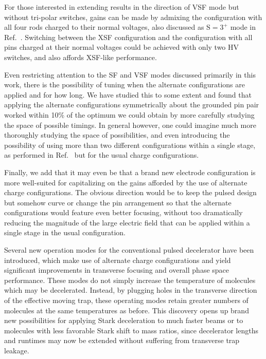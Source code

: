 \documentclass[%
 reprint,
 amsmath,amssymb,
 aps,
prl,
]{revtex4-1}
\begin{document}
For those interested in extending results in the direction of VSF mode but without tri-polar switches, gains can be made by admixing the configuration with all four rods charged to their normal voltages, also discussed as $\text{S}=3^+$ mode in Ref.~\cite{HudsonThesis2006}. Switching between the XSF configuration and the configuration with all pins charged at their normal voltages could be achieved with only two HV switches, and also affords XSF-like performance.

Even restricting attention to the SF and VSF modes discussed primarily in this work, there is the possibility of tuning when the alternate configurations are applied and for how long. 
We have studied this to some extent and found that applying the alternate configurations symmetrically about the grounded pin pair worked within 10\% of the optimum we could obtain by more carefully studying the space of possible timings.
In general however, one could imagine much more thoroughly studying the space of possibilities, and even introducing the possibility of using more than two different configurations within a single stage, as performed in Ref.~\cite{Zhang2016} but for the usual charge configurations.

Finally, we add that it may even be that a brand new electrode configuration is more well-suited for capitalizing on the gains afforded by the use of alternate charge configurations. The obvious direction would be to keep the pulsed design but somehow curve or change the pin arrangement so that the alternate configurations would feature even better focusing, without too dramatically reducing the magnitude of the large electric field that can be applied within a single stage in the usual configuration.

Several new operation modes for the conventional pulsed decelerator have been introduced, which make use of alternate charge configurations and yield significant improvements in transverse focusing and overall phase space performance.
These modes do not simply increase the temperature of molecules which may be decelerated.
Instead, by plugging holes in the transverse direction of the effective moving trap, these operating modes retain greater numbers of molecules at the same temperatures as before.
This discovery opens up brand new possibilities for applying Stark deceleration to much faster beams or to molecules with less favorable Stark shift to mass ratios, since decelerator lengths and runtimes may now be extended without suffering from transverse trap leakage.
\end{document}
